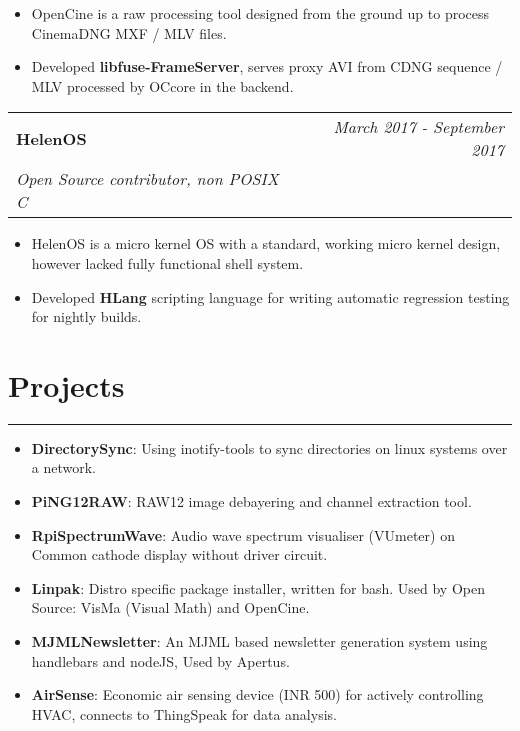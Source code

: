 \documentclass[9pt, a4paper]{article}
\begin{document}
\begin{itemize}
	\itemsep0em
	\item OpenCine is a raw processing tool designed from the ground up to process CinemaDNG MXF / MLV files.
	\item Developed \textbf{libfuse-FrameServer}, serves proxy AVI from CDNG sequence / MLV processed by OCcore in the backend.
\end{itemize}

\vspace{6px}
\hspace{5px}
\begin{tabularx}{\textwidth}{X r}
	\textbf{HelenOS} & \textit{March 2017 - September 2017} \\
	\textit{\small Open Source contributor, non POSIX C} & \\
\end{tabularx}

\begin{itemize}
	\itemsep0em
	\item HelenOS is a micro kernel OS with a standard, working micro kernel design, however lacked fully functional shell system.
	\item Developed \textbf{HLang} scripting language for writing automatic regression testing for nightly builds.
\end{itemize}

\section*{Projects}
\vspace{-8px}
\hrule
\vspace{4px}
\hspace{5px}
\begin{itemize}
	\item \textbf{DirectorySync}: Using inotify-tools to sync directories on linux systems over a network.
	\item \textbf{PiNG12RAW}: RAW12 image debayering and channel extraction tool.
	\item \textbf{RpiSpectrumWave}: Audio wave spectrum visualiser (VUmeter) on Common cathode display without driver circuit. 
	\item \textbf{Linpak}: Distro specific package installer, written for bash. Used by Open Source: VisMa (Visual Math) and OpenCine.
	\item \textbf{MJMLNewsletter}: An MJML based newsletter generation system using handlebars and nodeJS, Used by Apertus.
	\item \textbf{AirSense}: Economic air sensing device (INR 500) for actively controlling HVAC, connects to ThingSpeak for data analysis.
\end{itemize}
\end{document}
